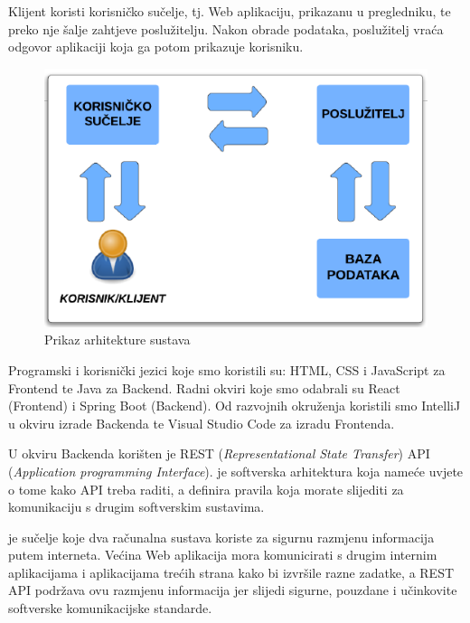 		{Klijent koristi korisničko sučelje, tj. Web aplikaciju, prikazanu u pregledniku, te preko nje šalje zahtjeve poslužitelju. Nakon obrade podataka, poslužitelj vraća odgovor aplikaciji koja ga potom prikazuje korisniku.}\vspace{0.3cm}
		
		\begin{figure}[H]
		\includegraphics[scale=1]{slike/ArhitekturaSustava.png}
		\centering
		\caption{Prikaz arhitekture sustava}
		\label{fig:ArhitekturaSustava}
		\end{figure}

		{Programski i korisnički jezici koje smo koristili su: HTML, CSS i JavaScript za Frontend te Java za Backend. Radni okviri koje smo odabrali su React (Frontend) i Spring Boot (Backend). Od razvojnih okruženja koristili smo IntelliJ u okviru izrade Backenda te Visual Studio Code za izradu Frontenda.}\vspace{0.3cm}

		{U okviru Backenda korišten je REST (\textit{Representational State Transfer}) API (\textit{Application programming Interface}).  je softverska arhitektura koja nameće uvjete o tome kako API treba raditi, a  definira pravila koja morate slijediti za komunikaciju s drugim softverskim sustavima.}\vspace{0.3cm}

		{ je sučelje koje dva računalna sustava koriste za sigurnu razmjenu informacija putem interneta. Većina Web aplikacija mora komunicirati s drugim internim aplikacijama i aplikacijama trećih strana kako bi izvršile razne zadatke, a REST API podržava ovu razmjenu informacija jer slijedi sigurne, pouzdane i učinkovite softverske komunikacijske standarde.}\pagebreak
		

